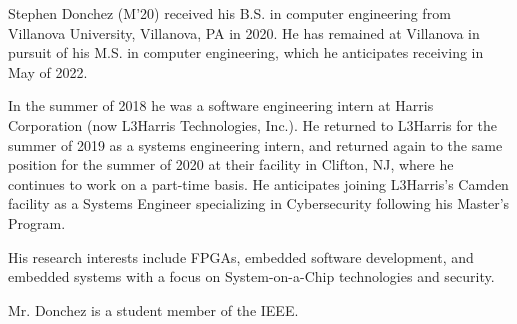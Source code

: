 
\begin{IEEEbiography}
	{Stephen Donchez}
	(M'20) received his B.S. in computer engineering from Villanova University, Villanova, PA in 2020. He has remained at Villanova in pursuit of his M.S. in computer engineering, which he anticipates receiving in May of 2022.

	In the summer of 2018 he was a software engineering intern at Harris Corporation (now L3Harris Technologies, Inc.). He returned to L3Harris for the summer of 2019 as a systems engineering intern, and returned again to the same position for the summer of 2020 at their facility in Clifton, NJ, where he continues to work on a part-time basis.  He anticipates joining L3Harris's Camden facility as a Systems Engineer specializing in Cybersecurity following his Master's Program.

	His research interests include FPGAs, embedded software development, and embedded systems with a focus on System-on-a-Chip technologies and security.

	Mr. Donchez is a student member of the IEEE.
\end{IEEEbiography}
